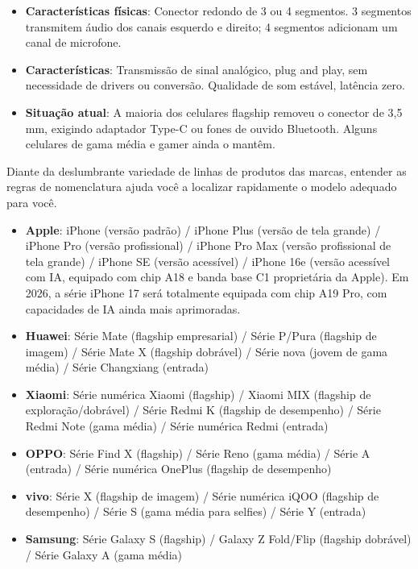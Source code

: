 
\begin{itemize}
  \item \textbf{Características físicas}: Conector redondo de 3 ou 4 segmentos. 3 segmentos transmitem áudio dos canais esquerdo e direito; 4 segmentos adicionam um canal de microfone.
  \item \textbf{Características}: Transmissão de sinal analógico, plug and play, sem necessidade de drivers ou conversão. Qualidade de som estável, latência zero.
  \item \textbf{Situação atual}: A maioria dos celulares flagship removeu o conector de 3,5 mm, exigindo adaptador Type-C ou fones de ouvido Bluetooth. Alguns celulares de gama média e gamer ainda o mantêm.
\end{itemize}


Diante da deslumbrante variedade de linhas de produtos das marcas, entender as regras de nomenclatura ajuda você a localizar rapidamente o modelo adequado para você.


\begin{itemize}
  \item \textbf{Apple}: iPhone (versão padrão) / iPhone Plus (versão de tela grande) / iPhone Pro (versão profissional) / iPhone Pro Max (versão profissional de tela grande) / iPhone SE (versão acessível) / iPhone 16e (versão acessível com IA, equipado com chip A18 e banda base C1 proprietária da Apple). Em 2026, a série iPhone 17 será totalmente equipada com chip A19 Pro, com capacidades de IA ainda mais aprimoradas.
  \item \textbf{Huawei}: Série Mate (flagship empresarial) / Série P/Pura (flagship de imagem) / Série Mate X (flagship dobrável) / Série nova (jovem de gama média) / Série Changxiang (entrada)
  \item \textbf{Xiaomi}: Série numérica Xiaomi (flagship) / Xiaomi MIX (flagship de exploração/dobrável) / Série Redmi K (flagship de desempenho) / Série Redmi Note (gama média) / Série numérica Redmi (entrada)
  \item \textbf{OPPO}: Série Find X (flagship) / Série Reno (gama média) / Série A (entrada) / Série numérica OnePlus (flagship de desempenho)
  \item \textbf{vivo}: Série X (flagship de imagem) / Série numérica iQOO (flagship de desempenho) / Série S (gama média para selfies) / Série Y (entrada)
  \item \textbf{Samsung}: Série Galaxy S (flagship) / Galaxy Z Fold/Flip (flagship dobrável) / Série Galaxy A (gama média)
\end{itemize}

